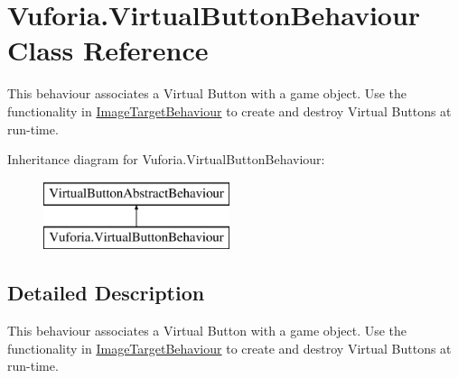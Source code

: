 \hypertarget{class_vuforia_1_1_virtual_button_behaviour}{}\section{Vuforia.\+Virtual\+Button\+Behaviour Class Reference}
\label{class_vuforia_1_1_virtual_button_behaviour}


This behaviour associates a Virtual Button with a game object. Use the functionality in \hyperlink{class_vuforia_1_1_image_target_behaviour}{Image\+Target\+Behaviour} to create and destroy Virtual Buttons at run-\/time.  


Inheritance diagram for Vuforia.\+Virtual\+Button\+Behaviour\+:\begin{figure}[H]
\begin{center}
\leavevmode
\includegraphics[height=2.000000cm]{class_vuforia_1_1_virtual_button_behaviour}
\end{center}
\end{figure}


\subsection{Detailed Description}
This behaviour associates a Virtual Button with a game object. Use the functionality in \hyperlink{class_vuforia_1_1_image_target_behaviour}{Image\+Target\+Behaviour} to create and destroy Virtual Buttons at run-\/time. 

